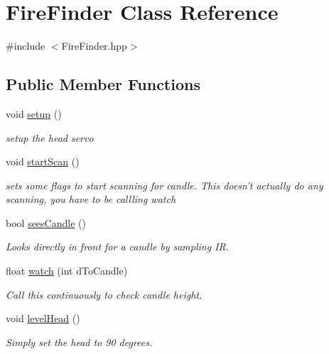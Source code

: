 \hypertarget{classFireFinder}{\section{Fire\-Finder Class Reference}
\label{classFireFinder}
}


{\ttfamily \#include $<$Fire\-Finder.\-hpp$>$}

\subsection*{Public Member Functions}
\begin{DoxyCompactItemize}
\item 
void \hyperlink{classFireFinder_aaa2beb5a87e2d9dbd83c0dee1f4f1ef0}{setup} ()
\begin{DoxyCompactList}\small\item\em setup the head servo \end{DoxyCompactList}\item 
void \hyperlink{classFireFinder_ab2cddefdf1200e176231a601a3a1ede3}{start\-Scan} ()
\begin{DoxyCompactList}\small\item\em sets some flags to start scanning for candle. This doesn't actually do any scanning, you have to be callling watch \end{DoxyCompactList}\item 
bool \hyperlink{classFireFinder_afa2879ee6ace8a6b5e298c4186df6178}{sees\-Candle} ()
\begin{DoxyCompactList}\small\item\em Looks directly in front for a candle by sampling I\-R. \end{DoxyCompactList}\item 
float \hyperlink{classFireFinder_afbdb8a5938750d5091becec74fc1f907}{watch} (int d\-To\-Candle)
\begin{DoxyCompactList}\small\item\em Call this continuously to check candle height. \end{DoxyCompactList}\item 
void \hyperlink{classFireFinder_ad0ce95ec7a5858be9b80a3c103120008}{level\-Head} ()
\begin{DoxyCompactList}\small\item\em Simply set the head to 90 degrees. \end{DoxyCompactList}\end{DoxyCompactItemize}
